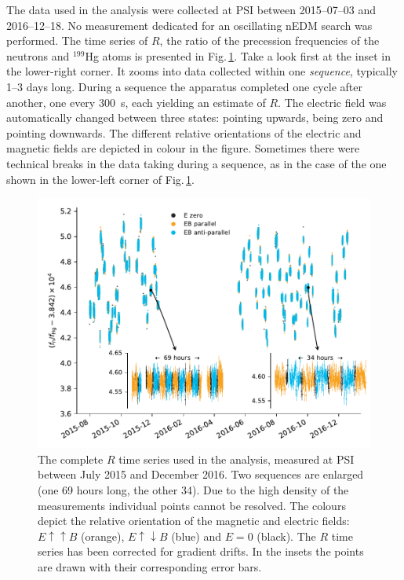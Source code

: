 The data used in the analysis were collected at PSI between 2015--07--03 and 2016--12--18.
No measurement dedicated for an oscillating nEDM search was performed. The time series of $R$, the ratio of the precession frequencies of the neutrons and ${}^{199}$Hg atoms is presented in Fig.\,\ref{fig:PSI_dataset_time_domain}.
Take a look first at the inset in the lower-right corner. It zooms into data collected within one \emph{sequence}, typically 1--3 days long.
During a sequence the apparatus completed one cycle after another, one every \SI{300}{\second}, each yielding an estimate of $R$.
The electric field was automatically changed between three states: pointing upwards, being zero and pointing downwards. The different relative orientations of the electric and magnetic fields are depicted in colour in the figure. Sometimes there were technical breaks in the data taking during a sequence, as in the case of the one shown in the lower-left corner of Fig.\,\ref{fig:PSI_dataset_time_domain}.

\begin{figure}
  \centering
  \includegraphics[width=\linewidth]{gfx/axions/deltah4mm_time_domain_inset_no_yerr.pdf}
  \caption{The complete $R$ time series used in the analysis, measured at PSI between July 2015 and December 2016. Two sequences are enlarged (one 69 hours long, the other 34). Due to the high density of the measurements individual points cannot be resolved. The colours depict the relative orientation of the magnetic and electric fields: $E \uparrow \uparrow B$ (orange), $E \uparrow \downarrow B$ (blue) and $E=0$ (black). The $R$ time series has been corrected for gradient drifts. In the insets the points are drawn with their corresponding error bars.}\label{fig:PSI_dataset_time_domain}
\end{figure}

